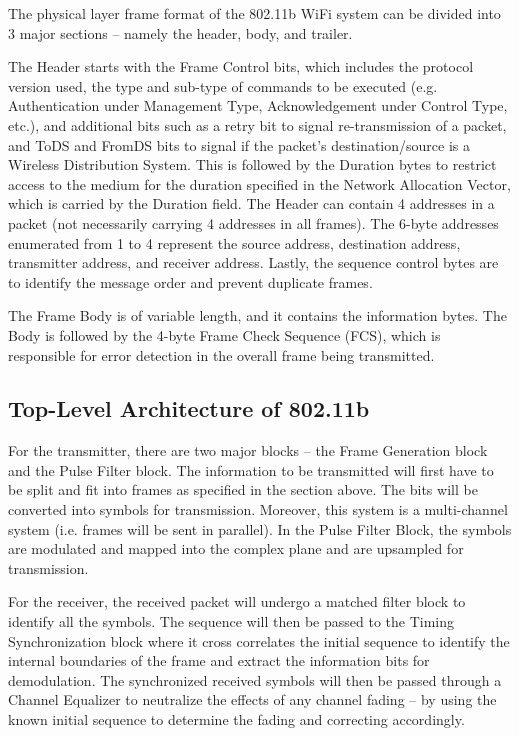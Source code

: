 \begin{flushleft}
The physical layer frame format of the 802.11b WiFi system can be divided into 3 major
sections – namely the header, body, and trailer. \break

The Header starts with the Frame Control bits, which includes the protocol version used, the
type and sub-type of commands to be executed (e.g. Authentication under Management Type,
Acknowledgement under Control Type, etc.), and additional bits such as a retry bit to signal
re-transmission of a packet, and ToDS and FromDS bits to signal if the packet’s
destination/source is a Wireless Distribution System. This is followed by the Duration bytes
to restrict access to the medium for the duration specified in the Network Allocation Vector,
which is carried by the Duration field. The Header can contain 4 addresses in a packet (not
necessarily carrying 4 addresses in all frames). The 6-byte addresses enumerated from 1 to 4
represent the source address, destination address, transmitter address, and receiver address. Lastly, the sequence control bytes are to identify the message order and prevent duplicate
frames. \break

The Frame Body is of variable length, and it contains the information bytes. The Body is
followed by the 4-byte Frame Check Sequence (FCS), which is responsible for error
detection in the overall frame being transmitted.

\subsection*{Top-Level Architecture of 802.11b}

For the transmitter, there are two major blocks – the Frame Generation block and the Pulse
Filter block. The information to be transmitted will first have to be split and fit into frames
as specified in the section above. The bits will be converted into symbols for transmission.
Moreover, this system is a multi-channel system (i.e. frames will be sent in parallel). In the
Pulse Filter Block, the symbols are modulated and mapped into the complex plane and are
upsampled for transmission. \break

For the receiver, the received packet will undergo a matched filter block to identify all
the symbols. The sequence will then be passed to the Timing Synchronization block where it
cross correlates the initial sequence to identify the internal boundaries of the frame and
extract the information bits for demodulation. The synchronized received symbols will then
be passed through a Channel Equalizer to neutralize the effects of any channel fading – by
using the known initial sequence to determine the fading and correcting accordingly. \break


\end{flushleft}
